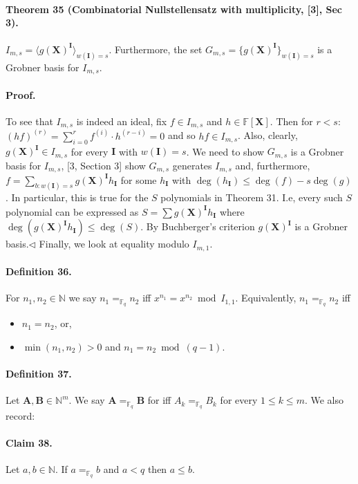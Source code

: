 \documentclass[10pt,a4paper]{article}
\begin{document}
\paragraph{Theorem 35 (Combinatorial Nullstellensatz with multiplicity, [3], Sec 3).} $I_{m,s}=\langle g(\boldsymbol X)^{\boldsymbol I}\rangle_{w(\boldsymbol I)=s}$. Furthermore, the set $G_{m,s}=\{g(\boldsymbol X)^{\boldsymbol I}\}_{w(\boldsymbol I)=s}$ is a Grobner basis for $I_{m,s}$.
\paragraph{Proof.} To see that $I_{m,s}$ is indeed an ideal, fix $f\in I_{m,s}$ and $h\in\mathbb F[\boldsymbol X]$. Then for $r<s$: $(hf)^{(r)}=\sum_{i=0}^rf^{(i)}\cdot h^{(r-i)}=0$ and so $hf\in I_{m,s}$. Also, clearly, $g(\boldsymbol X)^{\boldsymbol I}\in I_{m,s}$ for every $\boldsymbol I$ with $w(\boldsymbol I)=s$. We need to show $G_{m,s}$ is a Grobner basis for $I_{m,s}$,
[3, Section 3] show $G_{m,s}$ generates $I_{m,s}$ and, furthermore, $f=\sum_{b:w(\boldsymbol I)=s}g(\boldsymbol X)^{\boldsymbol I}h_{\boldsymbol I}$ for some $h_{\boldsymbol I}$ with $\deg(h_{\boldsymbol I})\leq\deg(f)-s\deg(g)$. In particular, this is true for the $S$ polynomials in Theorem 31. I.e, every such $S$ polynomial can be expressed as $S=\sum g(\boldsymbol X)^{\boldsymbol I}h_{\boldsymbol I}$ where $\deg(g(\boldsymbol X)^{\boldsymbol I}h_{\boldsymbol I})\leq\deg(S)$. By Buchberger's criterion $g(\boldsymbol X)^{\boldsymbol I}$ is a Grobner basis.\hfill$\triangleleft$
Finally, we look at equality modulo $I_{m,1}$.
\paragraph{Definition 36.} For $n_1,n_2\in\mathbb N$ we say $n_1=_{\mathbb F_q}n_2$ iff $x^{n_1}=x^{n_2}\bmod I_{1,1}$. Equivalently, $n_1=_{\mathbb F_q}n_2$ iff
\begin{itemize}
\item $n_1=n_2$, or,
\item $\min(n_1,n_2)>0$ and $n_1=n_2\bmod(q-1)$.
\end{itemize}
\paragraph{Definition 37.} Let $\boldsymbol A,\boldsymbol B\in\mathbb N^m$. We say $\boldsymbol A=_{\mathbb F_q}\boldsymbol B$ for iff $A_k=_{\mathbb F_q}B_k$ for every $1\leq k\leq m$.
We also record:
\paragraph{Claim 38.} Let $a,b\in\mathbb N$. If $a=_{\mathbb F_q}b$ and $a<q$ then $a\leq b$.
\end{document}
